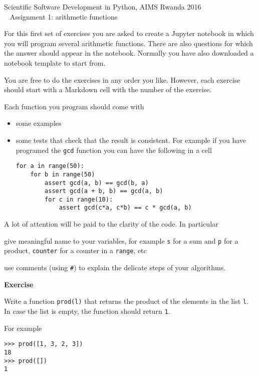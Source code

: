 \documentclass[a4paper]{article}
\newcounter{exo}
\newenvironment{exercise}%
{\par\vspace{.5\baselineskip}\noindent
\refstepcounter{exo}%
\textbf{Exercise \theexo}%
\par\vspace{.5\baselineskip}\noindent\ignorespaces
\begin{center}\begin{minipage}{0.9\linewidth}}%
{\end{minipage}\end{center}\smallskip}
\begin{document}
\begin{center}
\Large Scientific Software Development in Python, AIMS Rwanda 2016 \\ \smallskip
Assignment 1: arithmetic functions
\end{center}

\bigskip

For this first set of exercises you are asked to create a Jupyter notebook in
which you will program several arithmetic functions. There are also questions
for which the answer should appear in the notebook. Normally you have also
downloaded a notebook template to start from.

You are free to do the exercises in any order you like. However, each exercise
should start with a Markdown cell with the number of the exercise.

Each function you program should come with
\begin{itemize}
\item some examples
\item some tests that check that the result is consistent. For example if you have
programed the \texttt{gcd} function you can have the following in a cell
\begin{verbatim}
for a in range(50):
    for b in range(50)
        assert gcd(a, b) == gcd(b, a)
        assert gcd(a + b, b) == gcd(a, b)
        for c in range(10):
            assert gcd(c*a, c*b) == c * gcd(a, b)
\end{verbatim}
\end{itemize}

A lot of attention will be paid to the clarity of the code. In particular
\begin{compactitem}
\item give meaningful name to your variables, for example \texttt{s} for a
sum and \texttt{p} for a product, \texttt{counter} for a counter in
a \texttt{range}, etc
\item use comments (using \texttt{\#}) to explain the delicate steps
of your algorithms.
\end{compactitem}

\smallskip

\begin{exercise}
Write a function \texttt{prod(l)} that returns the product of the elements in
the list \texttt{l}. In case the list is empty, the function should return
\texttt{1}.

\smallskip\noindent
For example
\begin{verbatim}
>>> prod([1, 3, 2, 3])
18
>>> prod([])
1
\end{verbatim}
\end{exercise}
\end{document}
